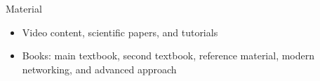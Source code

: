 
\begin{frame}{Material}
    \begin{itemize}
        \item Video content, scientific papers, and tutorials
        \item Books: main textbook, second textbook, reference material, modern networking, and advanced approach
        \vspace{0.5cm}
    \end{itemize}
\end{frame}